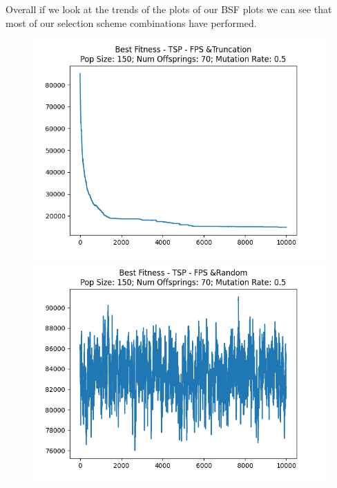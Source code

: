 \documentclass[12pt]{report}
\theoremstyle{mytheoremstyle}
\theoremstyle{mytheoremstyle}
\theoremstyle{myproblemstyle}
\begin{document}
Overall if we look at the trends of the plots of our BSF plots we can see that most of our selection scheme combinations have performed.
\begin{figure}[!]
	\centering
	\begin{minipage}{0.4\textwidth}
		\includegraphics[width=\linewidth]{../Analysis/BSF_TSP_0_3_150_70.png}
	\end{minipage}
	\hspace{\fill}
	\begin{minipage}{0.4\textwidth}
		\includegraphics[width=\linewidth]{../Analysis/BSF_TSP_0_4_150_70.png}
	\end{minipage}
	\vspace*{1cm}
	\begin{minipage}{0.4\textwidth}

\end{minipage}
\end{figure}
\end{document}

